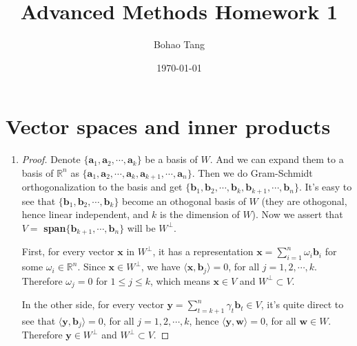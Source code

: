\documentclass[12pt]{article}
\title{Advanced Methods Homework 1}
\date{\today}
\author{Bohao Tang}
\begin{document}
\maketitle

\section{Vector spaces and inner products}
\begin{enumerate}
   \item
   \begin{proof}
        Denote $\{\textbf{a}_1,\textbf{a}_2,\cdots,\textbf{a}_k\}$ be a basis of $W$.
        And we can expand them to a basis of $\mathbb{R}^n$ as $\{\textbf{a}_1,\textbf{a}_2,\cdots,\textbf{a}_k,\textbf{a}_{k+1},\cdots,\textbf{a}_n\}$.
        Then we do Gram-Schmidt orthogonalization to the basis and get 
        $\{\textbf{b}_1,\textbf{b}_2,\cdots,\textbf{b}_k,\textbf{b}_{k+1},\cdots,\textbf{b}_n\}$.
        It's easy to see that $\{\textbf{b}_1,\textbf{b}_2,\cdots,\textbf{b}_k\}$ become an othogonal basis of $W$
        (they are othogonal, hence linear independent, and $k$ is the dimension of $W$).
        Now we assert that $V = $ \textbf{span}$\{\textbf{b}_{k+1},\cdots,\textbf{b}_n\}$ will be $W^\bot$.
       
        First, for every vector $\textbf{x}$ in $W^\bot$, it has a representation $\textbf{x} = \sum_{i=1}^n \omega_i \textbf{b}_i$ for some $\omega_i \in \mathbb{R}^n$.
        Since $\textbf{x} \in W^\bot$, we have $\langle \textbf{x} , \textbf{b}_j \rangle = 0$, for all $j = 1,2,\cdots,k$.
        Therefore $\omega_j = 0$ for $1 \le j \le k$, which means $\textbf{x} \in V$ and $W^\bot \subset V$.
        
        In the other side, for every vector $\textbf{y} = \sum_{t=k+1}^n \gamma_t \textbf{b}_t \in V$, it's quite direct to see that $\langle \textbf{y} , \textbf{b}_j \rangle = 0$, for all $j = 1,2,\cdots,k$,
        hence $\langle \textbf{y} , \textbf{w} \rangle = 0$, for all $\textbf{w} \in W$.
        Therefore $\textbf{y} \in W^\bot$ and $W^\bot \subset V$.


\end{proof}
\end{enumerate}
\end{document}

